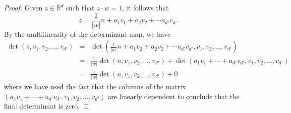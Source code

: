 \documentclass[11pt, letter]{book}
\renewcommand\det{\operatorname{det}}
\newcommand{\lp}{\left(}
\newcommand{\rp}{\right)}
\begin{document}
\begin{proof}
Given $z\in\mathbb{R}^d$ such that $z\cdot w=1$, it follows that 
\begin{equation*}
z=\frac{1}{|w|}n+a_1v_1+a_2v_2+\cdots a_{d'}v_{d'}.
\end{equation*}
By the multilinearity of the determinant map, we have
\begin{eqnarray*}
\det(z,v_1,v_2,\dots,v_{d'}) &=&\det\lp \frac{1}{|w|}n+a_1v_2+a_2v_2+\cdots a_{d'} v_{d'},v_1,v_2,\dots,v_{d'}\rp\\
    &=&\frac{1}{|w|}\det(n,v_1,v_2,\dots,v_{d'})+\det(a_1v_1+\cdots+a_{d'} v_{d'}, v_1,v_2,\dots,v_{d'})\\
&=&\frac{1}{|w|}\det(n, v_1,v_2,\dots,v_{d'})+0
\end{eqnarray*}
where we have used the fact that the columns of the matrix $(a_1v_1+\cdots+a_{d'} v_{d'}, v_1,v_2,\dots,v_{d'})$ are linearly dependent to conclude that the final determinant is zero.
\end{proof}
\end{document}
